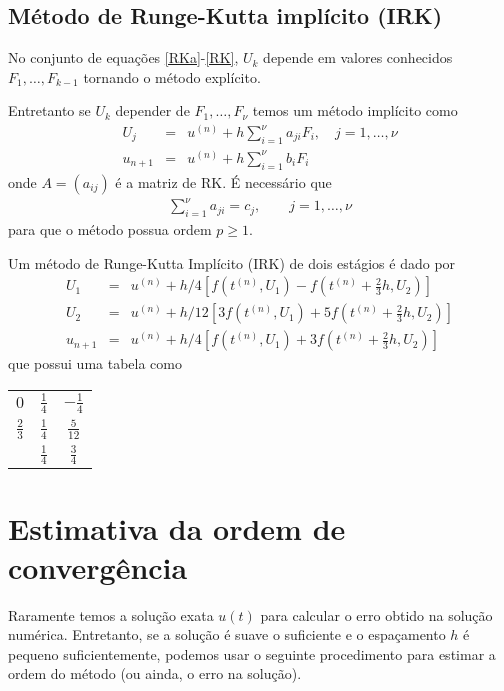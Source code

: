 \subsection{Método de Runge-Kutta implícito (IRK)}
No conjunto de equações \eqref{RKa}-\eqref{RK}, $U_k$ depende em valores conhecidos $F_1,\ldots ,F_{k-1}$ tornando o método explícito.

Entretanto se $U_k$ depender de $F_1,\ldots ,F_\nu $ temos um método implícito como
\begin{eqnarray}\label{IRK}
  U_j &=&u^{(n)}  + h \sum_{i=1}^\nu  a_{ji} F_i, \quad  j=1,\ldots ,\nu \\
  u_{n+1}&=&u^{(n)}  + h \sum_{i=1}^{\nu } b_i F_i
\end{eqnarray}
onde $A=(a_{ij})$ é a matriz de RK. É necessário que
\begin{eqnarray}
 \sum_{i=1}^{\nu } a_{ji} = c_j, \quad \quad  j=1,\ldots ,\nu
\end{eqnarray}
para que o método possua ordem $p\geq 1$.


\begin{ex}
Um método de Runge-Kutta Implícito (IRK) de dois estágios é dado por
\begin{eqnarray}
  U_1 &=&u^{(n)}  + h/4  [ f(t^{(n)},U_1) - f(t^{(n)}+\frac{2}{3}h,U_2)]\\
  U_2 &=&u^{(n)}  + h/12 [3f(t^{(n)},U_1) +5f(t^{(n)}+\frac{2}{3}h,U_2)]\\
  u_{n+1}&=&u^{(n)}  + h/4 [f(t^{(n)},U_1) +3f(t^{(n)}+\frac{2}{3}h,U_2)]
\end{eqnarray}
que possui uma tabela como
\begin{center}
\begin{tabular}{c|cc}
  $0$ & $\frac{1}{4}$ &$-\frac{1}{4}$  \\
  $\frac{2}{3}$ & $\frac{1}{4}$ &$\frac{5}{12}$  \\  \hline
      & $\frac{1}{4}$ &$\frac{3}{4}$
\end{tabular}
\end{center}
\end{ex}




\section{Estimativa da ordem de convergência}

Raramente temos a solução exata $u(t)$ para calcular o erro obtido na solução numérica. Entretanto, se a solução é suave o suficiente e o espaçamento $h$ é pequeno suficientemente, podemos usar o seguinte procedimento para estimar a ordem do método (ou ainda, o erro na solução).

